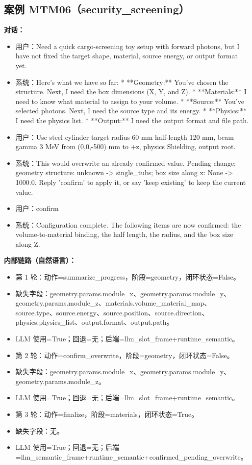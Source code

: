 \documentclass[11pt]{ctexart}
\begin{document}
\subsection{案例 MTM06（security\_screening）}
\textbf{对话：}
\begin{itemize}
\item 用户：Need a quick cargo-screening toy setup with forward photons, but I have not fixed the target shape, material, source energy, or output format yet.
\item 系统：Here's what we have so far:
*   **Geometry:** You've chosen the structure. Next, I need the box dimensions (X, Y, and Z).
*   **Materials:** I need to know what material to assign to your volume.
*   **Source:** You've selected photons. Next, I need the source type and its energy.
*   **Physics:** I need the physics list.
*   **Output:** I need the output format and file path.
\item 用户：Use steel cylinder target radius 60 mm half-length 120 mm, beam gamma 3 MeV from (0,0,-500) mm to +z, physics Shielding, output root.
\item 系统：This would overwrite an already confirmed value. Pending change: geometry structure: unknown -> single\_tubs; box size along x: None -> 1000.0. Reply 'confirm' to apply it, or say 'keep existing' to keep the current value.
\item 用户：confirm
\item 系统：Configuration complete. The following items are now confirmed: the volume-to-material binding, the half length, the radius, and the box size along Z.
\end{itemize}
\textbf{内部链路（自然语言）：}
\begin{itemize}
\item 第 1 轮：动作=summarize\_progress，阶段=geometry，闭环状态=False。
\item 缺失字段：geometry.params.module\_x、geometry.params.module\_y、geometry.params.module\_z、materials.volume\_material\_map、source.type、source.energy、source.position、source.direction、physics.physics\_list、output.format、output.path。
\item LLM 使用=True；回退=无；后端=llm\_slot\_frame+runtime\_semantic。
\item 第 2 轮：动作=confirm\_overwrite，阶段=geometry，闭环状态=False。
\item 缺失字段：geometry.params.module\_x、geometry.params.module\_y、geometry.params.module\_z。
\item LLM 使用=True；回退=无；后端=llm\_slot\_frame+runtime\_semantic。
\item 第 3 轮：动作=finalize，阶段=materials，闭环状态=True。
\item 缺失字段：无。
\item LLM 使用=True；回退=无；后端=llm\_semantic\_frame+runtime\_semantic+confirmed\_pending\_overwrite。
\end{itemize}
\end{document}
